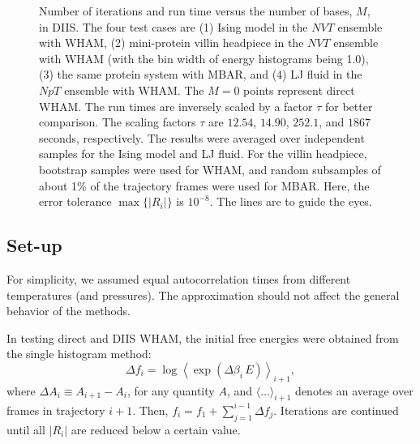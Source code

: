 \documentclass[reprint,aip,jcp,superscriptaddress]{revtex4-1}
\begin{document}
\begin{figure}[h]
  \caption{
    \label{fig:nsnt}
    Number of iterations
    and run time
    versus the number of bases, $M$,
    in DIIS.
    The four test cases are
    (1) Ising model in the $NVT$ ensemble with WHAM,
    (2) mini-protein villin headpiece in the $NVT$ ensemble with WHAM
    (with the bin width of energy histograms being 1.0),
    (3) the same protein system with MBAR,
    and
    (4) LJ fluid in the $NpT$ ensemble with WHAM.
    The $M = 0$ points represent direct WHAM.
    The run times are inversely scaled
    by a factor $\tau$
    for better comparison.
    The scaling factors $\tau$ are
    {\color{red} $12.54$, $14.90$, $252.1$, and $1867$} seconds,
    respectively.
    The results were averaged
    over independent samples
    for the Ising model and LJ fluid.
    For the villin headpiece,
    bootstrap\cite{
    newman, efron1979, hub2010}
    samples were used for WHAM,
    and random subsamples of about 1\% of the trajectory frames
    were used for MBAR.
    Here, the error tolerance
    $\max \{ |R_i| \}$ is $10^{-8}$.
    The lines are to guide the eyes.
  }
\end{figure}





\subsection{\label{sec:results_setup}
Set-up}



For simplicity,
we assumed equal autocorrelation times
from different temperatures (and pressures).
%
The approximation should not affect
the general behavior of the methods.



In testing direct and DIIS WHAM,
the initial free energies were obtained from
the single histogram method:
%
\begin{equation*}
\Delta f_i
=
\log
\left\langle
  \exp\left(
    \Delta \beta_i \, E
  \right)
\right\rangle_{i+1},
\end{equation*}
%
where $\Delta A_i \equiv A_{i+1} - A_i$,
for any quantity $A$,
and
$\langle\dots\rangle_{i + 1}$
denotes an average over frames in trajectory $i + 1$.
%
Then, $f_i = f_1 + \sum_{j = 1}^{i - 1} \Delta f_j$.
%
%
Iterations are continued
until all $|R_i|$ are reduced
below a certain value.
\end{document}
